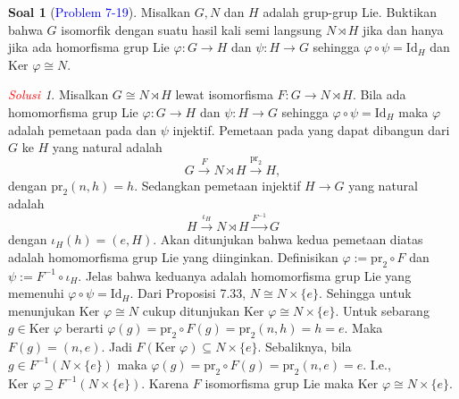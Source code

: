 \documentclass[11pt]{article}
\theoremstyle{definition}
\newtheorem*{problem}{Soal}
\theoremstyle{remark}
\newtheorem*{solution}{\textcolor{red}{Solusi}}
\newcommand{\kernel}{\text{Ker }}           %
\newcommand{\Id}{\text{Id}}                 %
\newcommand{\pr}{\text{pr}}                 %
\begin{document}
\begin{problem}[\textcolor{blue}{Problem 7-19}] 
Misalkan $G,N$ dan $H$ adalah grup-grup Lie. Buktikan bahwa $G$ isomorfik dengan suatu hasil kali semi langsung $N \rtimes H$ jika dan hanya jika ada homorfisma grup Lie $\varphi : G \to H$ dan $\psi : H \to G$ sehingga $\varphi \circ \psi = \text{Id}_H$ dan $\kernel \varphi \cong N$.
\end{problem}
\begin{solution}
Misalkan $G \cong N \rtimes H$ lewat isomorfisma $F : G \to N \rtimes H$. Bila ada homomorfisma grup Lie $\varphi : G \to H$ dan $\psi : H \to G$ sehingga $\varphi \circ \psi =\Id_H$ maka $\varphi$ adalah pemetaan pada dan $\psi$ injektif. Pemetaan pada yang dapat dibangun dari $G$ ke $H$ yang natural adalah
$$
G \xrightarrow{F} N \rtimes H \xrightarrow{\pr_2} H,
$$
dengan $\pr_2 (n,h) = h$. Sedangkan pemetaan injektif $H \to G$ yang natural adalah
$$
H \xrightarrow{\iota_H} N \rtimes H \xrightarrow{F^{-1}} G
$$
dengan $\iota_H(h) = (e,H)$. Akan ditunjukan bahwa kedua pemetaan diatas adalah homomorfisma grup Lie yang diinginkan. Definisikan $\varphi := \pr_2 \circ F$ dan $\psi:=F^{-1} \circ \iota_H$. Jelas bahwa keduanya adalah homomorfisma grup Lie yang memenuhi $\varphi \circ \psi = \Id_H$. Dari Proposisi 7.33, $N \cong N \times \{e\}$. Sehingga untuk menunjukan $\kernel \varphi \cong N$ cukup ditunjukan $\kernel \varphi \cong N \times \{e\}$. Untuk sebarang $g \in \kernel \varphi$ berarti $\varphi(g) = \pr_2 \circ F(g) = \pr_2(n,h) = h = e$. Maka $F(g) = (n,e)$. Jadi $F(\kernel \varphi) \subseteq N \times \{e\}$. Sebaliknya, bila $g \in F^{-1}(N \times \{e\})$ maka $\varphi(g) = \pr_2 \circ F(g) = \pr_2(n,e) = e$. I.e., $\kernel \varphi \supseteq F^{-1}(N \times \{e\})$. Karena $F$ isomorfisma grup Lie maka $\kernel \varphi \cong N \times \{e\}$.


\end{solution}
\end{document}
